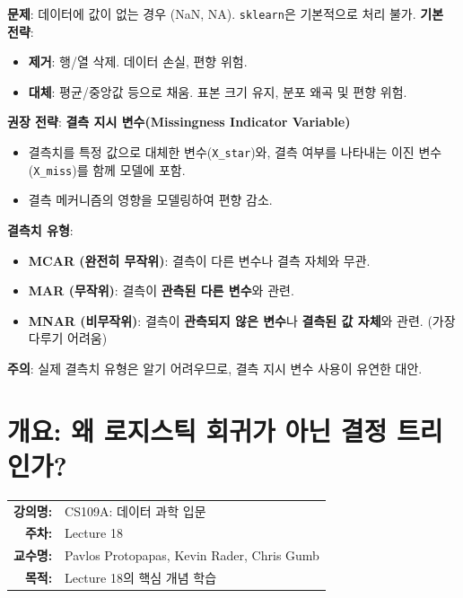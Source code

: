 \documentclass[11pt,a4paper]{book}
\makeatletter
\theoremstyle{definition}
\newcommand{\metainfo}[4]{
\begin{tcolorbox}[
    colback=lightpurple,
    colframe=darkpurple,
    boxrule=1pt,
    arc=2mm,
    left=10pt,
    right=10pt,
    top=8pt,
    bottom=8pt
]
\begin{tabular}{@{}rl@{}}
\textbf{강의명:} & #1 \\[0.3em]
\textbf{주차:} & #2 \\[0.3em]
\textbf{교수명:} & #3 \\[0.3em]
\textbf{목적:} & \begin{minipage}[t]{0.75\textwidth}#4\end{minipage}
\end{tabular}
\end{tcolorbox}
}
\makeatother
\begin{document}
\begin{summarybox}[title={결측치 처리 전략}]
\textbf{문제}: 데이터에 값이 없는 경우 (NaN, NA). \texttt{sklearn}은 기본적으로 처리 불가.
\textbf{기본 전략}:
\begin{itemize}
    \item \textbf{제거}: 행/열 삭제. 데이터 손실, 편향 위험.
    \item \textbf{대체}: 평균/중앙값 등으로 채움. 표본 크기 유지, 분포 왜곡 및 편향 위험.
\end{itemize}
\textbf{권장 전략}: \textbf{결측 지시 변수(Missingness Indicator Variable)}
\begin{itemize}
    \item 결측치를 특정 값으로 대체한 변수(\texttt{X\_star})와, 결측 여부를 나타내는 이진 변수(\texttt{X\_miss})를 함께 모델에 포함.
    \item 결측 메커니즘의 영향을 모델링하여 편향 감소.
\end{itemize}
\textbf{결측치 유형}:
\begin{itemize}
    \item \textbf{MCAR (완전히 무작위)}: 결측이 다른 변수나 결측 자체와 무관.
    \item \textbf{MAR (무작위)}: 결측이 \textbf{관측된 다른 변수}와 관련.
    \item \textbf{MNAR (비무작위)}: 결측이 \textbf{관측되지 않은 변수}나 \textbf{결측된 값 자체}와 관련. (가장 다루기 어려움)
\end{itemize}
\textbf{주의}: 실제 결측치 유형은 알기 어려우므로, 결측 지시 변수 사용이 유연한 대안.
\end{summarybox}


\chapter{개요: 왜 로지스틱 회귀가 아닌 결정 트리인가?}
\label{ch:lecture18}

\metainfo{CS109A: 데이터 과학 입문}{Lecture 18}{Pavlos Protopapas, Kevin Rader, Chris Gumb}{Lecture 18의 핵심 개념 학습}
\end{document}
